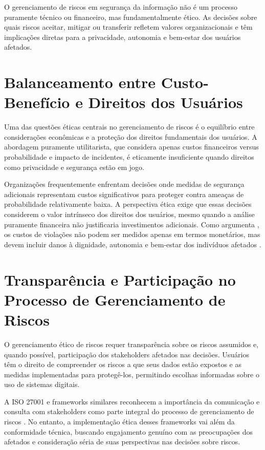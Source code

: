 O gerenciamento de riscos em segurança da informação não é um processo puramente técnico ou financeiro, mas fundamentalmente ético. As decisões sobre quais riscos aceitar, mitigar ou transferir refletem valores organizacionais e têm implicações diretas para a privacidade, autonomia e bem-estar dos usuários afetados.

\section{Balanceamento entre Custo-Benefício e Direitos dos Usuários}

Uma das questões éticas centrais no gerenciamento de riscos é o equilíbrio entre considerações econômicas e a proteção dos direitos fundamentais dos usuários. A abordagem puramente utilitarista, que considera apenas custos financeiros versus probabilidade e impacto de incidentes, é eticamente insuficiente quando direitos como privacidade e segurança estão em jogo.

Organizações frequentemente enfrentam decisões onde medidas de segurança adicionais representam custos significativos para proteger contra ameaças de probabilidade relativamente baixa. A perspectiva ética exige que essas decisões considerem o valor intrínseco dos direitos dos usuários, mesmo quando a análise puramente financeira não justificaria investimentos adicionais. Como argumenta \citeauthor{bishop2018computer}, os custos de violações não podem ser medidos apenas em termos monetários, mas devem incluir danos à dignidade, autonomia e bem-estar dos indivíduos afetados \cite{bishop2018computer}.

\section{Transparência e Participação no Processo de Gerenciamento de Riscos}

O gerenciamento ético de riscos requer transparência sobre os riscos assumidos e, quando possível, participação dos stakeholders afetados nas decisões. Usuários têm o direito de compreender os riscos a que seus dados estão expostos e as medidas implementadas para protegê-los, permitindo escolhas informadas sobre o uso de sistemas digitais.

A ISO 27001 e frameworks similares reconhecem a importância da comunicação e consulta com stakeholders como parte integral do processo de gerenciamento de riscos \cite{iso27001}. No entanto, a implementação ética desses frameworks vai além da conformidade técnica, buscando engajamento genuíno com as preocupações dos afetados e consideração séria de suas perspectivas nas decisões sobre riscos.


